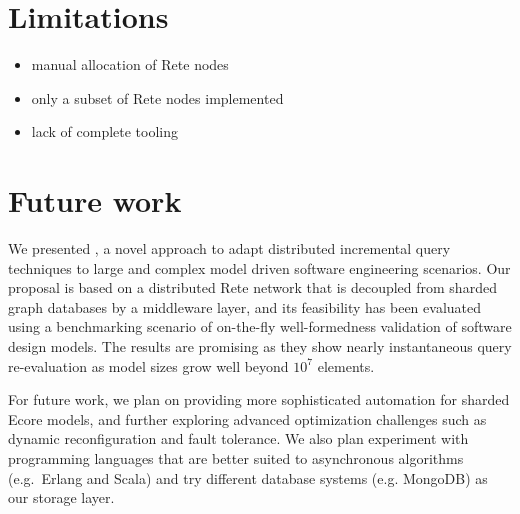 \section{Limitations}

\begin{itemize}
  \item manual allocation of Rete nodes
  \item only a subset of Rete nodes implemented 
  \item lack of complete tooling   
\end{itemize}

\section{Future work}
\label{sec:future-work}

We presented \iqd{}, a novel approach to adapt distributed incremental query techniques to large and complex model driven software engineering scenarios. Our proposal is based on a distributed Rete network that is decoupled from sharded graph databases by a middleware layer, and its feasibility has been evaluated using a benchmarking scenario of on-the-fly well-formedness validation of software design models. The results are promising as they show nearly instantaneous query re-evaluation as model sizes grow well beyond $10^7$ elements.


For future work, we plan on providing more sophisticated automation for sharded Ecore models, and further exploring advanced optimization challenges such as dynamic reconfiguration and fault tolerance.
We also plan experiment with programming languages that are better suited to asynchronous algorithms (e.g.\ Erlang and Scala) and try different database systems (e.g. MongoDB) as our storage layer.


